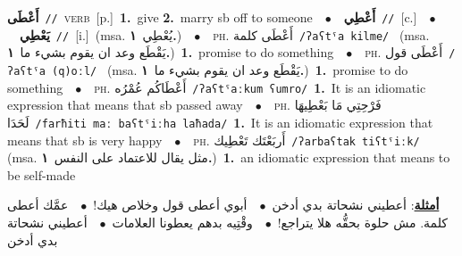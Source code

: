 \documentclass[10pt,a4paper,twoside]{article} %
\begin{document}
\begin{multicols}{2}
{\setlength\topsep{0pt}\textbf{\foreignlanguage{arabic}{أَعْطَى}}\ {\color{gray}\texttt{//}\color{black}}\ \textsc{verb}\ [p.]\ \textbf{1.}~give  \textbf{2.}~marry sb off to someone\ \ $\bullet$\ \ \setlength\topsep{0pt}\textbf{\foreignlanguage{arabic}{أَعْطِي}}\ {\color{gray}\texttt{//}\color{black}}\ [c.]\ \ $\bullet$\ \ \setlength\topsep{0pt}\textbf{\foreignlanguage{arabic}{يَعْطِي}}\ {\color{gray}\texttt{//}\color{black}}\ [i.]\ \color{gray}(msa. \foreignlanguage{arabic}{يُعْطِي}~\foreignlanguage{arabic}{\textbf{١.}})\color{black}\ \ $\bullet$\ \ \textsc{ph.} \color{gray} \foreignlanguage{arabic}{أَعْطَى كلمة}\color{black}\ {\color{gray}\texttt{/{\sffamily ʔaʕtˤa kilme}/}\color{black}}\ \color{gray} (msa. \foreignlanguage{arabic}{يَقْطَع وعد ان يقوم بشيء ما}~\foreignlanguage{arabic}{\textbf{١.}})\color{black}\ \textbf{1.}~promise to do something\ \ $\bullet$\ \ \textsc{ph.} \color{gray} \foreignlanguage{arabic}{أَعْطَى قول}\color{black}\ {\color{gray}\texttt{/{\sffamily ʔaʕtˤa (q)oːl}/}\color{black}}\ \color{gray} (msa. \foreignlanguage{arabic}{يَقْطَع وعد ان يقوم بشيء ما}~\foreignlanguage{arabic}{\textbf{١.}})\color{black}\ \textbf{1.}~promise to do something\ \ $\bullet$\ \ \textsc{ph.} \color{gray} \foreignlanguage{arabic}{أَعْطَاكُم عُمْرُه}\color{black}\ {\color{gray}\texttt{/{\sffamily ʔaʕtˤaːkum ʕumro}/}\color{black}}\ \textbf{1.}~It is an idiomatic expression that means that sb passed away\ \ $\bullet$\ \ \textsc{ph.} \color{gray} \foreignlanguage{arabic}{فَرْحِتِي مَا بَعْطِيهَا لَحَدَا}\color{black}\ {\color{gray}\texttt{/{\sffamily farħiti maː baʕtˤiːha laħada}/}\color{black}}\ \textbf{1.}~It is an idiomatic expression that means that sb is very happy\ \ $\bullet$\ \ \textsc{ph.} \color{gray} \foreignlanguage{arabic}{أَربَعْتَك تَعْطِيك}\color{black}\ {\color{gray}\texttt{/{\sffamily ʔarbaʕtak tiʕtˤiːk}/}\color{black}}\ \color{gray} (msa. \foreignlanguage{arabic}{مثل يقال للاعتماد على النفس}~\foreignlanguage{arabic}{\textbf{١.}})\color{black}\ \textbf{1.}~an idiomatic expression that means  to be self-made\  \begin{flushright}\color{gray}\foreignlanguage{arabic}{\textbf{\underline{\foreignlanguage{arabic}{أمثلة}}}: أعطيني نشحاتة بدي أدخن\ $\bullet$\ \  أبوي أعطى قول وخلاص هيك!\ $\bullet$\ \  عمَّك أعطى كلمة. مش حلوة بحقُّه هلا يتراجع!\ $\bullet$\ \  وقْتِيه بدهم يعطونا العلامات\ $\bullet$\ \  أعطيني نشحاتة بدي أدخن}\end{flushright}\color{black}} \vspace{2mm}


\end{multicols}
\end{document}
